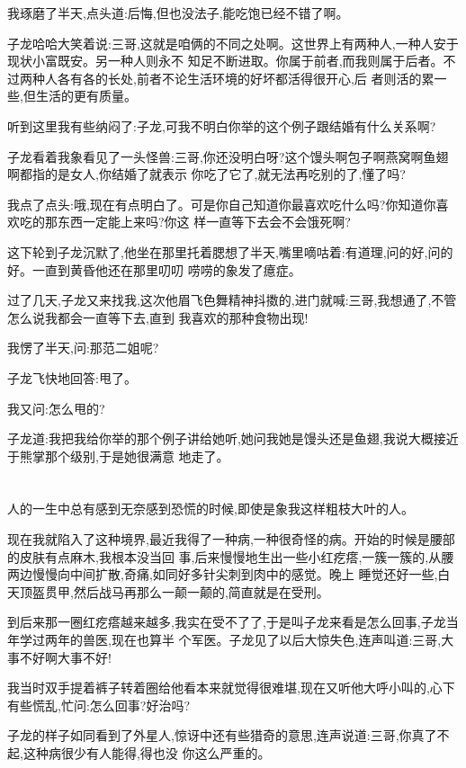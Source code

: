 ﻿\documentclass[12pt,twocolumn]{article}
\begin{document}
我琢磨了半天,点头道:后悔,但也没法子,能吃饱已经不错了啊。

子龙哈哈大笑着说:三哥,这就是咱俩的不同之处啊。这世界上有两种人,一种人安于现状小富既安。另一种人则永不
知足不断进取。你属于前者,而我则属于后者。不过两种人各有各的长处,前者不论生活环境的好坏都活得很开心,后
者则活的累一些,但生活的更有质量。

听到这里我有些纳闷了:子龙,可我不明白你举的这个例子跟结婚有什么关系啊?

子龙看着我象看见了一头怪兽:三哥,你还没明白呀?这个馒头啊包子啊燕窝啊鱼翅啊都指的是女人,你结婚了就表示
你吃了它了,就无法再吃别的了,懂了吗?

我点了点头:哦,现在有点明白了。可是你自己知道你最喜欢吃什么吗?你知道你喜欢吃的那东西一定能上来吗?你这
样一直等下去会不会饿死啊?

这下轮到子龙沉默了,他坐在那里托着腮想了半天,嘴里嘀咕着:有道理,问的好,问的好。一直到黄昏他还在那里叨叨
唠唠的象发了癔症。

过了几天,子龙又来找我,这次他眉飞色舞精神抖擞的,进门就喊:三哥,我想通了,不管怎么说我都会一直等下去,直到
我喜欢的那种食物出现!

我愣了半天,问:那范二姐呢?

子龙飞快地回答:甩了。

我又问:怎么甩的?

子龙道:我把我给你举的那个例子讲给她听,她问我她是馒头还是鱼翅,我说大概接近于熊掌那个级别,于是她很满意
地走了。

\section{}

人的一生中总有感到无奈感到恐慌的时候,即使是象我这样粗枝大叶的人。

现在我就陷入了这种境界,最近我得了一种病,一种很奇怪的病。开始的时候是腰部的皮肤有点麻木,我根本没当回
事,后来慢慢地生出一些小红疙瘩,一簇一簇的,从腰两边慢慢向中间扩散,奇痛,如同好多针尖刺到肉中的感觉。晚上
睡觉还好一些,白天顶盔贯甲,然后战马再那么一颠一颠的,简直就是在受刑。

到后来那一圈红疙瘩越来越多,我实在受不了了,于是叫子龙来看是怎么回事,子龙当年学过两年的兽医,现在也算半
个军医。子龙见了以后大惊失色,连声叫道:三哥,大事不好啊大事不好!

我当时双手提着裤子转着圈给他看本来就觉得很难堪,现在又听他大呼小叫的,心下有些慌乱,忙问:怎么回事?好治吗?

子龙的样子如同看到了外星人,惊讶中还有些猎奇的意思,连声说道:三哥,你真了不起,这种病很少有人能得,得也没
你这么严重的。
\end{document}
